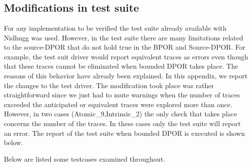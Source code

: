 \documentclass[diploma, english]{softlab-thesis}
\theoremstyle{definition}
\begin{document}

\tableofcontents
\listoftables
\listoffigures
\listoflistings
\listofalgorithms
{}

\mainmatter










\nocite{*}







\backmatter

\appendix

\chapter{ \label{appendix_a}}

\section{Modifications in test suite}
For any implementation to be verified the test suite already available with Nidhugg was used. However, in the test suite there are many limitations related to the source-DPOR
that do not hold true in the BPOR and Source-DPOR. For example, the test suit driver would report equivalent traces as errors even though that these traces cannot be eliminated
when bounded DPOR takes place. The reasons of this behavior have already been explained. In this appendix, we report the changes to the test driver.
The modification took place was rather straightforward since we just had to mute warnings when the number of traces exceeded the anticipated or equivalent traces were explored more than
once. However, in two cases (Atomic\_9,Intrinsic\_2) the only check that takes place concerns the number of the traces. In these cases only the test suite will report an error. 
The report of the test suite when bounded DPOR is executed is shown below.


Below are listed some testcases examined throughout.

%
\end{document}
